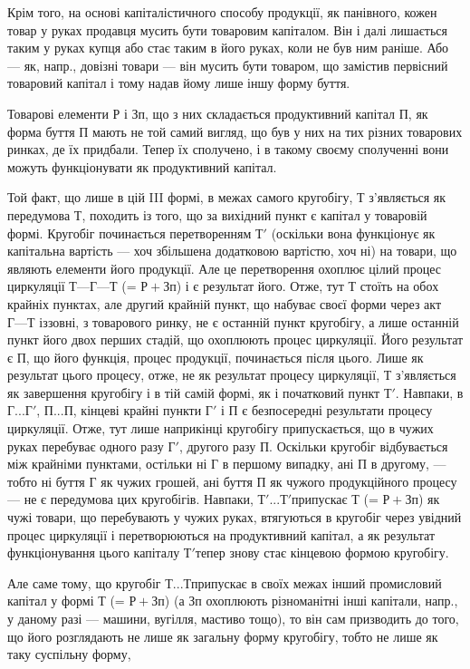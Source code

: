 Крім того, на основі капіталістичного способу продукції, як панівного, кожен товар у руках продавця
мусить бути товаровим капіталом. Він і далі лишається таким у руках купця або стає таким в його
руках, коли не був ним раніше. Або — як, напр., довізні товари — він мусить бути товаром, що
замістив первісний товаровий капітал і тому надав йому лише іншу форму буття.

Товарові елементи Р і Зп, що з них складається продуктивний капітал П, як форма буття П мають не той
самий вигляд, що був у них на тих різних товарових ринках, де їх придбали. Тепер їх сполучено, і в
такому своєму сполученні вони можуть функціонувати як продуктивний капітал.

Той факт, що лише в цій III формі, в межах самого кругобігу, Т з’являється як передумова Т, походить
із того, що за вихідний пункт є капітал у товаровій формі. Кругобіг починається перетворенням $Т'$
(оскільки вона функціонує як капітальна вартість — хоч збільшена додатковою вартістю, хоч ні) на
товари, що являють елементи його продукції. Але це перетворення охоплює цілий процес циркуляції $Т —
Г — Т$ (= $Р+Зп$) і є результат його. Отже, тут Т стоїть на обох крайніх пунктах, але другий крайній
пункт, що набуває своєї форми через акт $Г
— Т$ іззовні, з товарового ринку, не є останній пункт кругобігу, а лише останній пункт його двох
перших стадій, що охоплюють процес циркуляції. Його результат є П, що його функція, процес
продукції, починається після цього. Лише як результат цього процесу, отже, не як результат процесу
циркуляції, Т з’являється як завершення кругобігу і в тій самій формі, як і початковий пункт $Т'$.
Навпаки, в $Г... Г'$, $П... П$, кінцеві крайні пункти $Г'$ і П є безпосередні результати процесу
циркуляції. Отже, тут лише наприкінці кругобігу припускається, що в чужих руках перебуває одного
разу $Г'$, другого разу П. Оскільки кругобіг відбувається між крайніми пунктами, остільки ні Г в
першому випадку, ані П в другому, — тобто ні буття Г як чужих грошей, ані буття П як чужого
продукційного процесу — не є передумова цих кругобігів. Навпаки, $Т'... Т' п$рипускає Т (= $Р+Зп$) як
чужі товари,
що перебувають у чужих руках, втягуються в кругобіг через увідний процес циркуляції і перетворюються
на продуктивний капітал, а як результат функціонування цього капіталу $Т' т$епер знову стає кінцевою
формою кругобігу.

Але саме тому, що кругобіг $Т... Т п$рипускає в своїх межах інший промисловий капітал у формі Т (=
$Р+Зп$) (а Зп охоплюють різноманітні інші капітали, напр., у даному разі — машини, вугілля, мастиво
тощо), то він сам призводить до того, що його розглядають не лише як загальну форму кругобігу, тобто
не лише як таку суспільну форму,
\parbreak{}  %
